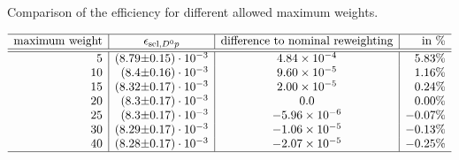  
\begin{table}[tb]
    \centering
    \caption{Comparison of the efficiency \effSelDp for different allowed maximum weights.}
    \label{tab:systematic_effD0p_maxweight}
    $\begin{array}{r|r@{\pm}l|c|r}
    \hline
    \text{maximum weight}  & \multicolumn{2}{c|}{\effSelDp}  & \text{difference to nominal reweighting} & \text{in \%} \\ \hline \hline
5 & (8.79 & 0.15) \cdot 10^{-3} & \num[round-mode=figures, round-precision=3]{0.000483640507719} & 5.83\%\\ 10 & (8.4 & 0.16) \cdot 10^{-3} & \num[round-mode=figures, round-precision=3]{9.60100390259e-05} & 1.16\%\\ 15 & (8.32 & 0.17) \cdot 10^{-3} & \num[round-mode=figures, round-precision=3]{2.00375500349e-05} & 0.24\%\\ 20 & (8.3 & 0.17) \cdot 10^{-3} & \num[round-mode=figures, round-precision=3]{0.0} & 0.00\%\\ 25 & (8.3 & 0.17) \cdot 10^{-3} & \num[round-mode=figures, round-precision=3]{-5.95559256641e-06} & -0.07\%\\ 30 & (8.29 & 0.17) \cdot 10^{-3} & \num[round-mode=figures, round-precision=3]{-1.05520925512e-05} & -0.13\%\\ 40 & (8.28 & 0.17) \cdot 10^{-3} & \num[round-mode=figures, round-precision=3]{-2.06929754863e-05} & -0.25\%\\ 
    \hline
    \end{array}$
\end{table}
